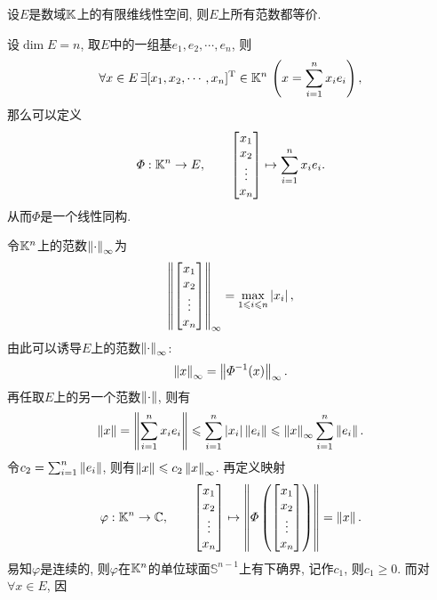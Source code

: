 	\begin{Theorem}
	设$ E $是数域$ \mathbb{K} $上的有限维线性空间, 则$ E $上所有范数都等价.
	\end{Theorem}
	\begin{Proof}
	设$ \dim E=n $, 取$ E $中的一组基$ e_1,e_2,\cdots,e_n $, 则
	\[
	\forall x\in E\,\exists[x_1,x_2,\cdots,x_n]^\mathrm{T}\in\mathbb{K}^n\,\left( x=\sum_{i=1}^nx_ie_i \right),
	\]
	那么可以定义
	\[
	\varPhi : \mathbb{K}^n\to E,\qquad \begin{bmatrix}
	x_1\\x_2\\\vdots\\x_n
	\end{bmatrix}\mapsto\sum_{i=1}^nx_ie_i.
	\]
	从而$ \varPhi $是一个线性同构.
	
	令$ \mathbb{K}^n $上的范数$ \left\| \cdot \right\|_\infty $为
	\[
	\left\| \begin{bmatrix}x_1\\x_2\\\vdots\\x_n\end{bmatrix} \right\|_\infty=\max_{1\leqslant i\leqslant n}\left| x_i \right| ,
	\]
	由此可以诱导$ E $上的范数$ \left\| \cdot \right\|_\infty $:
	\[
	\left\| x \right\|_\infty=\left\| \varPhi^{-1}(x) \right\|_\infty.
	\]
	再任取$ E $上的另一个范数$ \left\| \cdot \right\| $, 则有
	\[
	\left\| x \right\|=\left\| \sum_{i=1}^nx_ie_i \right\|\leqslant\sum_{i=1}^n\left| x_i \right| \left\| e_i \right\|\leqslant\left\| x \right\|_\infty\sum_{i=1}^n\left\| e_i \right\|.
	\]
	令$ c_2=\sum_{i=1}^n\left\| e_i \right\| $, 则有$ \left\| x \right\|\leqslant c_2\left\| x \right\|_\infty $. 再定义映射
	\[
	\varphi : \mathbb{K}^n\to\mathbb{C},\qquad\begin{bmatrix}x_1\\x_2\\\vdots\\x_n\end{bmatrix}\mapsto\left\| \varPhi\left(\begin{bmatrix}
	x_1\\x_2\\\vdots\\x_n
	\end{bmatrix}\right) \right\|=\left\| x \right\|.
	\]
	易知$ \varphi $是连续的, 则$ \varphi $在$ \mathbb{K}^n $的单位球面$ \mathbb{S}^{n-1} $上有下确界, 记作$ c_1 $, 则$ c_1\geqslant 0 $. 而对$ \forall x\in E $, 因
	\[
\]
\end{Proof}
